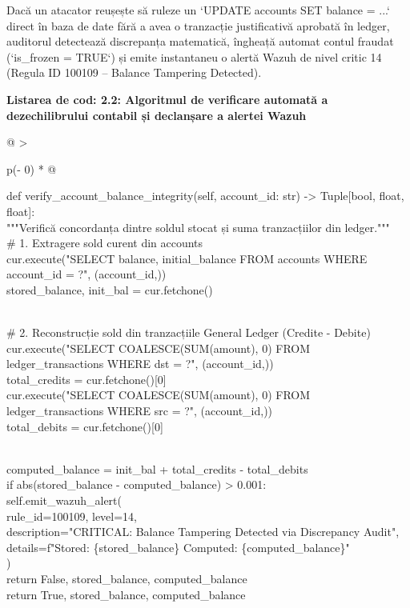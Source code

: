 \documentclass[
]{article}
\begin{document}
Dacă un atacator reușește să ruleze un `UPDATE accounts SET balance =
...` direct în baza de date fără a avea o tranzacție justificativă
aprobată în ledger, auditorul detectează discrepanța matematică,
îngheață automat contul fraudat (`is\_frozen = TRUE`) și emite
instantaneu o alertă Wazuh de nivel critic 14 (Regula ID 100109 --
Balance Tampering Detected).

\textbf{Listarea de cod: 2.2: Algoritmul de verificare automată a
dezechilibrului contabil și declanșare a alertei Wazuh}

\begin{longtable}[]{@{}
  >{\raggedright\arraybackslash}p{(\columnwidth - 0\tabcolsep) * }@{}}
\toprule\noalign{}
\begin{minipage}[b]{\linewidth}\raggedright
def verify\_account\_balance\_integrity(self, account\_id: str)
-\textgreater{} Tuple{[}bool, float, float{]}:\\
"""Verifică concordanța dintre soldul stocat și suma tranzacțiilor din
ledger."""\\
\# 1. Extragere sold curent din accounts\\
cur.execute("SELECT balance, initial\_balance FROM accounts WHERE
account\_id = ?", (account\_id,))\\
stored\_balance, init\_bal = cur.fetchone()\\
\strut \\
\# 2. Reconstrucție sold din tranzacțiile General Ledger (Credite -
Debite)\\
cur.execute("SELECT COALESCE(SUM(amount), 0) FROM ledger\_transactions
WHERE dst = ?", (account\_id,))\\
total\_credits = cur.fetchone(){[}0{]}\\
cur.execute("SELECT COALESCE(SUM(amount), 0) FROM ledger\_transactions
WHERE src = ?", (account\_id,))\\
total\_debits = cur.fetchone(){[}0{]}\\
\strut \\
computed\_balance = init\_bal + total\_credits - total\_debits\\
if abs(stored\_balance - computed\_balance) \textgreater{} 0.001:\\
self.emit\_wazuh\_alert(\\
rule\_id=100109, level=14,\\
description="CRITICAL: Balance Tampering Detected via Discrepancy
Audit",\\
details=f"Stored: \{stored\_balance\} \textbar{} Computed:
\{computed\_balance\}"\\
)\\
return False, stored\_balance, computed\_balance\\
return True, stored\_balance, computed\_balance\strut
\end{minipage} \\
\midrule\noalign{}
\endhead
\bottomrule\noalign{}
\endlastfoot
\end{longtable}
\end{document}
